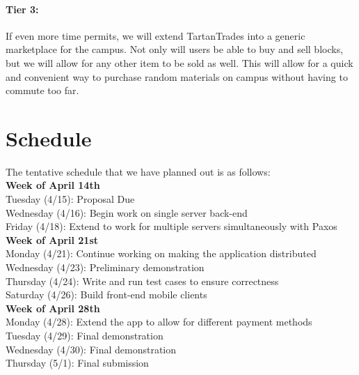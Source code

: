 \documentclass[12pt]{article}
\begin{document}
\paragraph{Tier 3:}
If even more time permits, we will extend TartanTrades into a generic marketplace for the campus. Not only will users be able to buy and sell blocks, but we will allow for any other item to be sold as well. This will allow for a quick and convenient way to purchase random materials on campus without having to commute too far.

\section{Schedule}

The tentative schedule that we have planned out is as follows:\\

\textbf{Week of April 14th}\\
Tuesday (4/15): Proposal Due\\
Wednesday (4/16): Begin work on single server back-end\\
Friday (4/18): Extend to work for multiple servers simultaneously with Paxos\\

\textbf{Week of April 21st}\\
Monday (4/21): Continue working on making the application distributed\\
Wednesday (4/23): Preliminary demonstration\\
Thursday (4/24): Write and run test cases to ensure correctness\\
Saturday (4/26): Build front-end mobile clients\\

\textbf{Week of April 28th}\\
Monday (4/28): Extend the app to allow for different payment methods\\
Tuesday (4/29): Final demonstration\\
Wednesday (4/30): Final demonstration\\
Thursday (5/1): Final submission 
\end{document}
